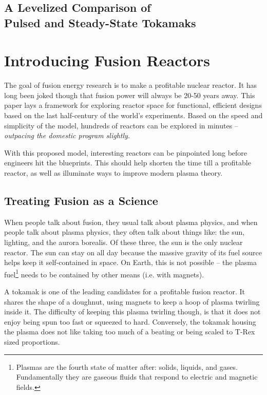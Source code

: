 \documentclass[11pt]{book}
\begin{document}
\section*{A Levelized Comparison of \\ Pulsed and Steady-State Tokamaks}

\let\cleardoublepage\relax \tableofcontents \newpage

\chapter{Introducing Fusion Reactors}

The goal of fusion energy research is to make a profitable nuclear reactor. It has long been joked though that fusion power will always be 20-50 years away. This paper lays a framework for exploring reactor space for functional, efficient designs based on the last half-century of the world's experiments. Based on the speed and simplicity of the model, hundreds of reactors can be explored in minutes -- \emph{outpacing the domestic program slightly.}

With this proposed model, interesting reactors can be pinpointed long before engineers hit the blueprints. This should help shorten the time till a profitable reactor, as well as illuminate ways to improve modern plasma theory.

\section{Treating Fusion  as a Science}

When people talk about fusion, they usual talk about plasma physics, and when people talk about plasma physics, they often talk about things like: the sun, lighting, and the aurora borealis. Of these three, the sun is the only nuclear reactor. The sun can stay on all day because the massive gravity of its fuel source helps keep it self-contained in space. On Earth, this is not possible -- the plasma fuel\footnote{Plasmas are the fourth state of matter after: solids, liquids, and gases. Fundamentally they are gaseous fluids that respond to electric and magnetic fields.} needs to be contained by other means (i.e. with magnets).

A tokamak is one of the leading candidates for a profitable fusion reactor. It shares the shape of a doughnut, using magnets to keep a hoop of plasma twirling inside it. The difficulty of keeping this plasma twirling though, is that it does not enjoy being spun too fast or squeezed to hard. Conversely, the tokamak housing the plasma does not like taking too much of a beating or being scaled to T-Rex sized proportions.
\end{document}
